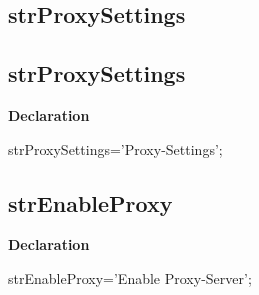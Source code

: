 \documentclass{report}
\newif\ifpdf
\begin{document}
\subsection*{\large{\textbf{strProxySettings}}\normalsize\hspace{1ex}\hrulefill}
\else
\subsection*{strProxySettings}
\fi
\label{trstrings-strProxySettings}
\begin{list}{}{
\setlength{\itemindent}{0cm}
\setlength{\listparindent}{0cm}
\setlength{\leftmargin}{\evensidemargin}
\addtolength{\leftmargin}{\tmplength}
\settowidth{\labelsep}{X}
\addtolength{\leftmargin}{\labelsep}
\setlength{\labelwidth}{\tmplength}
}
\item[\textbf{Declaration}\hfill]
\ifpdf
\begin{flushleft}
\fi
\begin{ttfamily}
strProxySettings='Proxy-Settings';\end{ttfamily}

\ifpdf
\end{flushleft}
\fi

\end{list}
\ifpdf
\subsection*{\large{\textbf{strEnableProxy}}\normalsize\hspace{1ex}\hrulefill}
\else
\subsection*{strEnableProxy}
\fi
\label{trstrings-strEnableProxy}
\begin{list}{}{
\setlength{\itemindent}{0cm}
\setlength{\listparindent}{0cm}
\setlength{\leftmargin}{\evensidemargin}
\addtolength{\leftmargin}{\tmplength}
\settowidth{\labelsep}{X}
\addtolength{\leftmargin}{\labelsep}
\setlength{\labelwidth}{\tmplength}
}
\item[\textbf{Declaration}\hfill]
\ifpdf
\begin{flushleft}
\fi
\begin{ttfamily}
strEnableProxy='Enable Proxy-Server';\end{ttfamily}

\ifpdf
\end{flushleft}
\fi

\end{list}
\ifpdf
\end{document}
